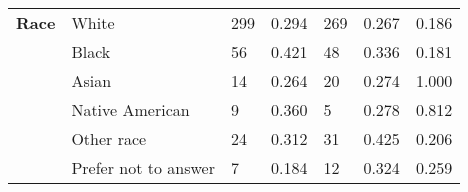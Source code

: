 \begin{tabular}{L{3cm} L{5cm} C{1.5cm} C{2.5cm} C{1.5cm} C{2.5cm} C{3cm}}
\textbf{Race}                                             &                          White                           &                           299                            &                          0.294                           &                           269                            &                          0.267                           &                          0.186                            \\
                                                          &                          Black                           &                            56                            &                          0.421                           &                            48                            &                          0.336                           &                          0.181                            \\
                                                          &                          Asian                           &                            14                            &                          0.264                           &                            20                            &                          0.274                           &                          1.000                            \\
                                                          &                     Native American                      &                            9                             &                          0.360                           &                            5                             &                          0.278                           &                          0.812                            \\
                                                          &                        Other race                        &                            24                            &                          0.312                           &                            31                            &                          0.425                           &                          0.206                            \\
                                                          &                   Prefer not to answer                   &                            7                             &                          0.184                           &                            12                            &                          0.324                           &                          0.259                            \\

\end{tabular}
